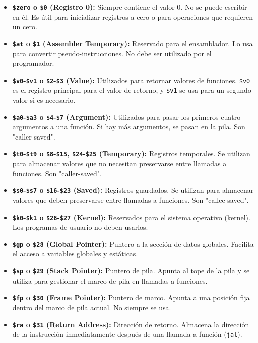 \documentclass{article}
\begin{document}
\begin{itemize}
    \item \textbf{\texttt{\$zero} o \texttt{\$0} (Registro 0):} Siempre contiene el valor 0. No se puede escribir en él. Es útil para inicializar registros a cero o para operaciones que requieren un cero.
    \item \textbf{\texttt{\$at} o \texttt{\$1} (Assembler Temporary):} Reservado para el ensamblador. Lo usa para convertir pseudo-instrucciones. No debe ser utilizado por el programador.
    \item \textbf{\texttt{\$v0}-\texttt{\$v1} o \texttt{\$2}-\texttt{\$3} (Value):} Utilizados para retornar valores de funciones. \texttt{\$v0} es el registro principal para el valor de retorno, y \texttt{\$v1} se usa para un segundo valor si es necesario.
    \item \textbf{\texttt{\$a0}-\texttt{\$a3} o \texttt{\$4}-\texttt{\$7} (Argument):} Utilizados para pasar los primeros cuatro argumentos a una función. Si hay más argumentos, se pasan en la pila. Son "caller-saved".
    \item \textbf{\texttt{\$t0}-\texttt{\$t9} o \texttt{\$8}-\texttt{\$15}, \texttt{\$24}-\texttt{\$25} (Temporary):} Registros temporales. Se utilizan para almacenar valores que no necesitan preservarse entre llamadas a funciones. Son "caller-saved".
    \item \textbf{\texttt{\$s0}-\texttt{\$s7} o \texttt{\$16}-\texttt{\$23} (Saved):} Registros guardados. Se utilizan para almacenar valores que deben preservarse entre llamadas a funciones. Son "callee-saved".
    \item \textbf{\texttt{\$k0}-\texttt{\$k1} o \texttt{\$26}-\texttt{\$27} (Kernel):} Reservados para el sistema operativo (kernel). Los programas de usuario no deben usarlos.
    \item \textbf{\texttt{\$gp} o \texttt{\$28} (Global Pointer):} Puntero a la sección de datos globales. Facilita el acceso a variables globales y estáticas.
    \item \textbf{\texttt{\$sp} o \texttt{\$29} (Stack Pointer):} Puntero de pila. Apunta al tope de la pila y se utiliza para gestionar el marco de pila en llamadas a funciones.
    \item \textbf{\texttt{\$fp} o \texttt{\$30} (Frame Pointer):} Puntero de marco. Apunta a una posición fija dentro del marco de pila actual. No siempre se usa.
    \item \textbf{\texttt{\$ra} o \texttt{\$31} (Return Address):} Dirección de retorno. Almacena la dirección de la instrucción inmediatamente después de una llamada a función (\texttt{jal}).
\end{itemize}
\end{document}
